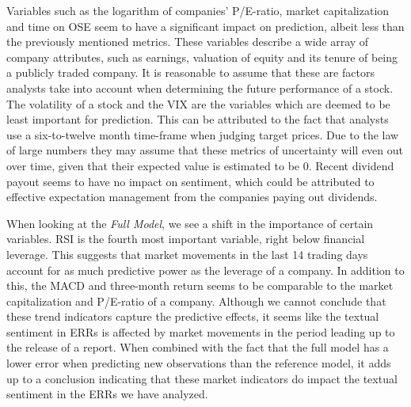 Variables such as the logarithm of companies' P/E-ratio, market capitalization and time on OSE seem to have a significant impact on prediction, albeit less than the previously mentioned metrics. These variables describe a wide array of company attributes, such as earnings, valuation of equity and its tenure of being a publicly traded company. It is reasonable to assume that these are factors analysts take into account when determining the future performance of a stock. The volatility of a stock and the VIX are the variables which are deemed to be least important for prediction. This can be attributed to the fact that analysts use a six-to-twelve month time-frame when judging target prices. Due to the law of large numbers they may assume that these metrics of uncertainty will even out over time, given that their expected value is estimated to be 0. Recent dividend payout seems to have no impact on sentiment, which could be attributed to effective expectation management from the companies paying out dividends.

When looking at the \textit{Full Model}, we see a shift in the importance of certain variables. RSI is the fourth most important variable, right below financial leverage. This suggests that market movements in the last 14 trading days account for as much predictive power as the leverage of a company. In addition to this, the MACD and three-month return seems to be comparable to the market capitalization and P/E-ratio of a company. Although we cannot conclude that these trend indicators capture the predictive effects, it seems like the textual sentiment in ERRs is affected by market movements in the period leading up to the release of a report. When combined with the fact that the full model has a lower error when predicting new observations than the reference model, it adds up to a conclusion indicating that these market indicators do impact the textual sentiment in the ERRs we have analyzed.

